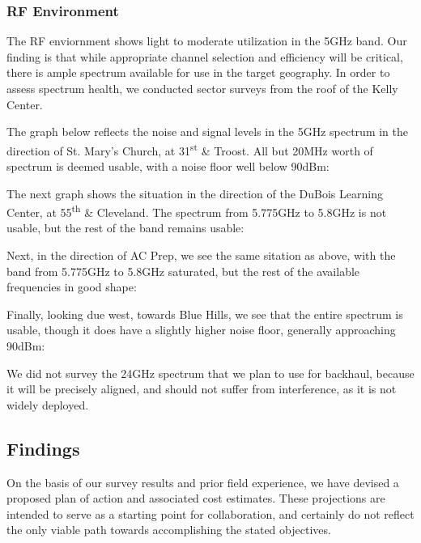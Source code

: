\subsubsection{RF Environment}
The RF enviornment shows light to moderate utilization in the 5GHz band. Our
finding is that while appropriate channel selection and efficiency will be critical,
there is ample spectrum available for use in the target geography. In order to
assess spectrum health, we conducted sector surveys from the roof of the Kelly Center. \par
The graph below reflects the noise and signal levels in the 5GHz spectrum in the direction
of St. Mary's Church, at 31\textsuperscript{st} \& Troost. All but 20MHz worth of spectrum
is deemed usable, with a noise floor well below 90dBm:
\begin{center}
\end{center}
The next graph shows the situation in the direction of the DuBois Learning Center, at 
55\textsuperscript{th} \& Cleveland. The spectrum from 5.775GHz to 5.8GHz is not usable, but the rest of the band remains usable:
\begin{center}
\end{center}
Next, in the direction of AC Prep, we see the same sitation as above, with the band from 5.775GHz to 5.8GHz saturated, but the rest of the available frequencies in good shape:
\begin{center}
\end{center}
Finally, looking due west, towards Blue Hills, we see that the entire spectrum is usable, though it does have a slightly higher noise floor, generally approaching 90dBm:
\begin{center}
\end{center}
We did not survey the 24GHz spectrum that we plan to use for backhaul, because it will be precisely aligned, and should not suffer from interference, as it is not widely deployed.
\subsection{Findings}
On the basis of our survey results and prior field experience, we have devised
a proposed plan of action and associated cost estimates. These projections are intended
to serve as a starting point for collaboration, and certainly do not reflect the
only viable path towards accomplishing the stated objectives.\par
